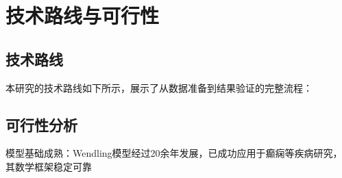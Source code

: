 
\section{技术路线与可行性}

\subsection{技术路线}

本研究的技术路线如下所示，展示了从数据准备到结果验证的完整流程：

\subsection{可行性分析}

模型基础成熟​：Wendling模型经过20余年发展，已成功应用于癫痫等疾病研究，其数学框架稳定可靠
